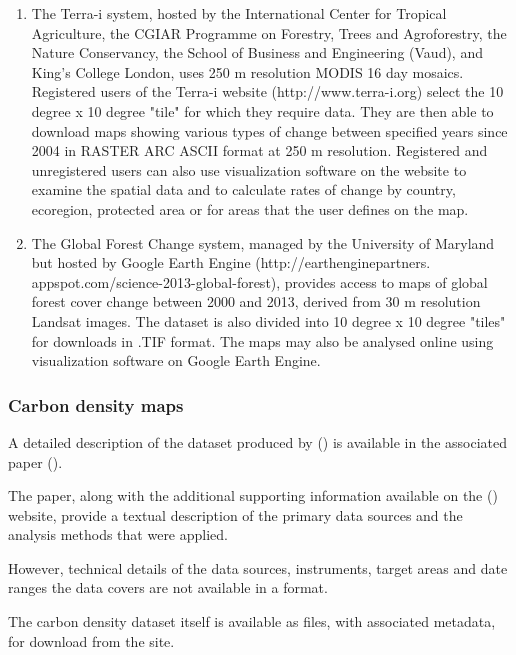 \documentclass{article}
\begin{document}
\begin{enumerate}
    \item The Terra-i system, hosted by the International Center for
    Tropical Agriculture, the CGIAR Programme on Forestry, Trees and
    Agroforestry, the Nature Conservancy, the School of Business and
    Engineering (Vaud), and King’s College London, uses 250 m resolution
    MODIS 16 day mosaics. Registered users of the Terra-i website
    (http://www.terra-i.org) select the 10 degree x 10 degree "tile" for
    which they require data. They are then able to download maps showing
    various types of change between specified years since 2004 in RASTER ARC
    ASCII format at 250 m resolution. Registered and unregistered users can
    also use visualization software on the website to examine the spatial
    data and to calculate rates of change by country, ecoregion, protected
    area or for areas that the user defines on the map.

    \item The Global Forest Change system, managed by the
    University of Maryland but hosted by Google Earth Engine
    (http://earthenginepartners. appspot.com/science-2013-global-forest),
    provides access to maps of global forest cover change between 2000
    and 2013, derived from 30 m resolution Landsat images. The dataset
    is also divided into 10 degree x 10 degree "tiles" for downloads in
    .TIF format. The maps may also be analysed online using visualization
    software on Google Earth Engine.
\end{enumerate}

\subsubsection{Carbon density maps}

A detailed description of the dataset produced by 
(\cite{nasa-jpl-carbon}) is available in the associated paper
(\cite{saatchi-2011}).

The paper, along with the additional supporting information available
on the  (\cite{pnas}) website,
provide a textual description
of the primary data sources
and the analysis methods that were applied.

However, technical details of the data sources, instruments, target areas
and date ranges the data covers are not available in a
\cite{machine-readable}
format.

The carbon density dataset itself is available as \cite{format-geotiff}
files, with associated \cite{format-world} metadata, for download from the
\cite{nasa-jpl-carbon-ftp} site.
\end{document}
